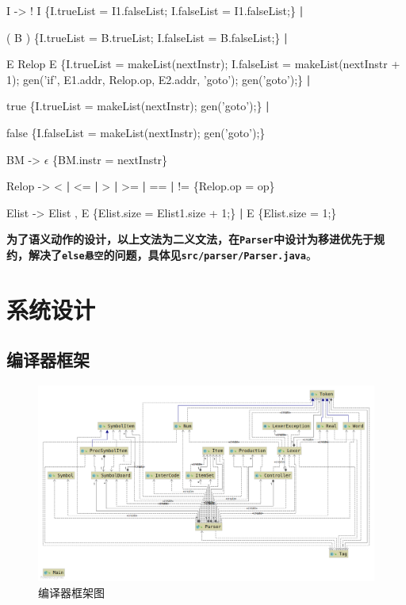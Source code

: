 \documentclass{ML}
\begin{document}
\begin{enumerate}
{    \item I -> ! I {\color{red}\{I.trueList = I1.falseList; I.falseList = I1.falseList;\}} \textbf{|}
    
    \hspace{1cm}( B ) {\color{red}\{I.trueList = B.trueList; I.falseList = B.falseList;\}} \textbf{|}
    
    \hspace{1cm}E Relop E {\color{red}\{I.trueList = makeList(nextInstr); I.falseList = makeList(nextInstr + 1); gen('if', E1.addr, Relop.op, E2.addr, 'goto'); gen('goto');\}} \textbf{|}
    
    \hspace{1cm}true {\color{red}\{I.trueList = makeList(nextInstr); gen('goto');\}} \textbf{|}
    
    \hspace{1cm}false {\color{red}\{I.falseList = makeList(nextInstr); gen('goto');\}}
    \vspace{0.5cm}
    
    \item BM -> $\epsilon$ {\color{red}\{BM.instr = nextInstr\}}
    \vspace{0.5cm}
    
    \item Relop -> < \textbf{|} <= \textbf{|} > \textbf{|} >= \textbf{|} == \textbf{|} != {\color{red}\{Relop.op = op\}}
    \vspace{0.5cm}
    
    \item Elist -> Elist , E {\color{red}\{Elist.size = Elist1.size + 1;\}} \textbf{|}
         E {\color{red}\{Elist.size = 1;\}}
    }
\end{enumerate}

\textbf{为了语义动作的设计，以上文法为二义文法，在\texttt{Parser}中设计为移进优先于规约，解决了\texttt{else悬空}的问题，具体见\texttt{src/parser/Parser.java}}。
\section{系统设计}
\subsection{编译器框架}
\begin{figure}[H]
    \centering
    \includegraphics[width=1\linewidth]{media/Compiler.png}
    \caption{编译器框架图}\label{fig:compiler}
\end{figure}
\end{document}
